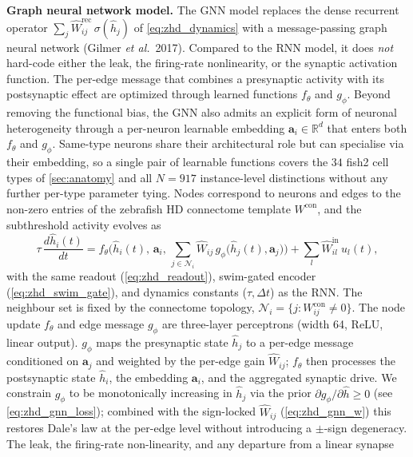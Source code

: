 \documentclass[11pt]{article}
\def\R{\mathbb{R}}
\begin{document}
\bigskip
\noindent\textbf{Graph neural network model.}\label{method:GNN}
The GNN model replaces the dense recurrent operator
$\sum_j \hat W^{\mathrm{rec}}_{ij}\,\sigma(\hat h_j)$ of
\cref{eq:zhd_dynamics} with a message-passing graph neural network
(Gilmer \emph{et al.}\ 2017). Compared to the RNN model, it does \emph{not}
hard-code either the leak, the firing-rate nonlinearity, or the
synaptic activation function. The per-edge message that combines a
presynaptic activity with its postsynaptic effect are optimized through learned functions $f_\theta$ and $g_\phi$. Beyond removing the functional bias, the GNN also admits an explicit form
of neuronal heterogeneity through a per-neuron learnable embedding
$\mathbf a_i \in \R^d$ that enters both $f_\theta$ and $g_\phi$.
Same-type neurons share their architectural role but can specialise
via their embedding, so a single pair of learnable functions covers the $34$ fish2
cell types of \cref{sec:anatomy} and all $N = 917$ instance-level
distinctions without any further per-type parameter tying. Nodes correspond to neurons and edges to the non-zero entries of the zebrafish HD connectome template
$W^{\mathrm{con}}$, and the subthreshold activity evolves as
\begin{equation}
\tau\,\frac{d\hat h_i(t)}{dt}
  = f_\theta\!\Big(\hat h_i(t),\,\mathbf a_i,\,
       \sum_{j \in \mathcal N_i}
       \hat W_{ij}\,g_\phi\!\big(\hat h_j(t),\mathbf a_j\big)\Big)
  + \sum_l \hat W^{\mathrm{in}}_{il}\,u_l(t),
\label{eq:zhd_gnn_dynamics}
\end{equation}
with the same readout (\cref{eq:zhd_readout}), swim-gated encoder
(\cref{eq:zhd_swim_gate}), and dynamics constants ($\tau,\Delta t$)
as the RNN. The neighbour set is fixed by the connectome topology,
$\mathcal N_i = \{j : W^{\mathrm{con}}_{ij} \neq 0\}$. The node
update $f_\theta$ and edge message $g_\phi$ are three-layer
perceptrons (width 64, ReLU, linear output). $g_\phi$ maps the
presynaptic state $\hat h_j$ to a per-edge message conditioned on
$\mathbf a_j$ and weighted by the per-edge gain $\hat W_{ij}$;
$f_\theta$ then processes the postsynaptic state $\hat h_i$, the
embedding $\mathbf a_i$, and the aggregated synaptic drive. We
constrain $g_\phi$ to be monotonically increasing in $\hat h_j$ via
the prior $\partial g_\phi / \partial \hat h \ge 0$ (see
\cref{eq:zhd_gnn_loss}); combined with the sign-locked $\hat W_{ij}$
(\cref{eq:zhd_gnn_w}) this restores Dale's law at the per-edge level
without introducing a $\pm$-sign degeneracy. The leak, the
firing-rate non-linearity, and any departure from a linear synapse
\end{document}
